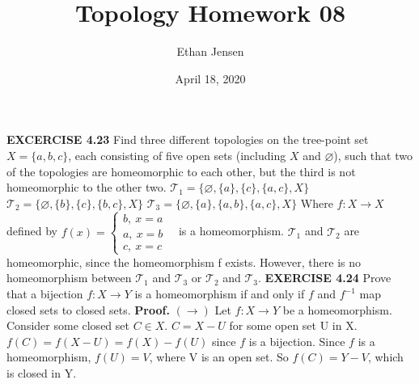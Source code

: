 \documentclass[12pt]{article}
\title{Topology Homework 08}
\author{Ethan Jensen}
\date{April 18, 2020}
\begin{document}
  \maketitle
  \noindent
  \textbf{EXCERCISE 4.23}
  \newline
  Find three different topologies on the tree-point set \(X=\{a,b,c\}\), each consisting of five open sets (including \(X\) and \(\varnothing\)), such that two of the topologies are homeomorphic to each other, but the third is not homeomorphic to the other two.
  \newline \newline
  \(\mathcal{T}_1 = \{\varnothing, \{a\}, \{c\}, \{a,c\}, X\}\)
  \newline
  \(\mathcal{T}_2 = \{\varnothing, \{b\}, \{c\}, \{b,c\}, X\}\)
  \newline
  \(\mathcal{T}_3 = \{\varnothing, \{a\}, \{a,b\}, \{a,c\}, X\}\)
  \newline
  \newline
  Where \(f:X\rightarrow X\) defined by
  \(f(x) = \left\{ \begin{matrix}
  b,\ x=a  \\
  a,\ x=b  \\
  c,\ x=c
\end{matrix}\right.\)\ \ is a homeomorphism.
\newline
\newline
\(\mathcal{T}_1\) and \(\mathcal{T}_2\) are homeomorphic, since the homeomorphism f exists. However, there is no homeomorphism between \(\mathcal{T}_1\) and \(\mathcal{T}_3\) or \(\mathcal{T}_2\) and \(\mathcal{T}_3\).
\newpage
\noindent
\textbf{EXERCISE 4.24}
\newline
Prove that a bijection \(f: X \rightarrow Y\) is a homeomorphism if and only if \(f\) and \(f^{-1}\) map closed sets to closed sets.
\newline \newline
\textbf{Proof.}
\newline
\((\rightarrow)\) Let \(f: X \rightarrow Y\) be a homeomorphism.
\newline
Consider some closed set \(C \in X\).
\newline
\(C = X - U\) for some open set U in X.
\newline
\(f(C) = f(X-U) = f(X) - f(U)\) since \(f\) is a bijection.
\newline
Since \(f\) is a homeomorphism, \(f(U) = V\), where V is an open set.
\newline
So \(f(C) = Y - V\), which is closed in Y.
\end{document}
